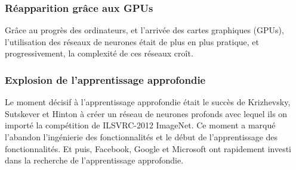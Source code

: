 \subsubsection{Réapparition grâce aux GPUs}
Grâce au progrès des ordinateurs, et l'arrivée des cartes graphiques (GPUs), l'utilisation des réseaux de neurones était de plus en plus pratique, et progressivement, la complexité de ces réseaux croît.
\subsubsection{Explosion de l'apprentissage approfondie}
Le moment décisif à l'apprentissage approfondie était le succès de Krizhevsky, Sutskever et Hinton \cite{NIPS2012_c399862d} à créer un réseau de neurones profonds avec lequel ils on importé la compétition de ILSVRC-2012 ImageNet.
\newline Ce moment a marqué l'abandon l'ingénierie des fonctionnalités et le début de l'apprentissage des fonctionnalités. Et puis, Facebook, Google et Microsoft ont rapidement investi dans la recherche de l'apprentissage approfondie.
